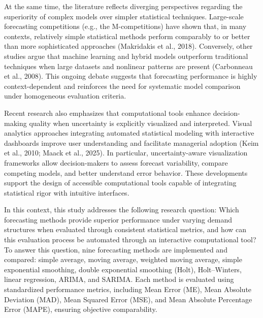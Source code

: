 \documentclass[journal,article,submit,pdftex,moreauthors]{Definitions/mdpi}
\begin{document}
At the same time, the literature reflects diverging perspectives regarding the superiority of complex models over simpler statistical techniques. Large-scale forecasting competitions (e.g., the M-competitions) have shown that, in many contexts, relatively simple statistical methods perform comparably to or better than more sophisticated approaches (Makridakis et al., 2018). Conversely, other studies argue that machine learning and hybrid models outperform traditional techniques when large datasets and nonlinear patterns are present (Carbonneau et al., 2008). This ongoing debate suggests that forecasting performance is highly context-dependent and reinforces the need for systematic model comparison under homogeneous evaluation criteria.

Recent research also emphasizes that computational tools enhance decision-making quality when uncertainty is explicitly visualized and interpreted. Visual analytics approaches integrating automated statistical modeling with interactive dashboards improve user understanding and facilitate managerial adoption (Keim et al., 2010; Maack et al., 2025). In particular, uncertainty-aware visualization frameworks allow decision-makers to assess forecast variability, compare competing models, and better understand error behavior. These developments support the design of accessible computational tools capable of integrating statistical rigor with intuitive interfaces.

In this context, this study addresses the following research question: Which forecasting methods provide superior performance under varying demand structures when evaluated through consistent statistical metrics, and how can this evaluation process be automated through an interactive computational tool? To answer this question, nine forecasting methods are implemented and compared: simple average, moving average, weighted moving average, simple exponential smoothing, double exponential smoothing (Holt), Holt–Winters, linear regression, ARIMA, and SARIMA. Each method is evaluated using standardized performance metrics, including Mean Error (ME), Mean Absolute Deviation (MAD), Mean Squared Error (MSE), and Mean Absolute Percentage Error (MAPE), ensuring objective comparability.
\end{document}
